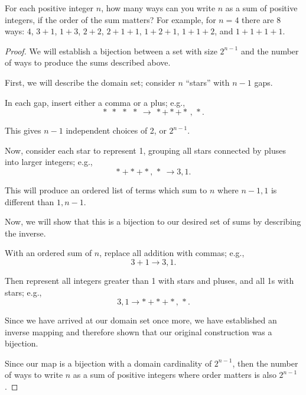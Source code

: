 \documentclass{article}
\begin{document}
For each positive integer $n$, how many ways can you write $n$ as a sum of positive integers, if the order of the sum matters? For example, for $n=4$ there are 8 ways: $4$, $3+1$, $1+3$, $2+2$, $2+1+1$, $1+2+1$, $1+1+2$, and $1+1+1+1$.
\begin{proof}
	We will establish a bijection between a set with size $2^{n-1}$ and the number of ways to produce the sums described above.

	First, we will describe the domain set;
	consider $n$ ``stars'' with $n-1$ gaps.

	In each gap, insert either a comma or a plus; e.g.,
	\[
		*\ \ *\ \ *\ \ * \ \to\ * + * + * \, ,\, *
		.\]

	This gives $n-1$ independent choices of 2, or  $2^{n-1}$.

	Now, consider each star to represent 1, grouping all stars connected by pluses into larger integers; e.g.,
	\[
		* + * + * \, ,\, * \ \to 3, 1
		.\]

	This will produce an ordered list of terms which sum to $n$ where $n-1,1$ is different than $1,n-1$.

	Now, we will show that this is a bijection to our desired set of sums by describing the inverse.

	With an ordered sum of $n$, replace all addition with commas; e.g.,
	\[
		3+1 \to  3,1
		.\]

	Then represent all integers greater than 1 with stars and pluses, and all 1s with stars; e.g.,
	\[
		3,1 \to  * + * + * \, ,\, *
		.\]

	Since we have arrived at our domain set once more, we have established an inverse mapping and therefore shown that our original construction was a bijection.

	Since our map is a bijection with a domain cardinality of $2^{n-1}$, then the number of ways to write $n$ as a sum of positive integers where order matters is also  $2^{n-1}$.

\end{proof}
\end{document}
